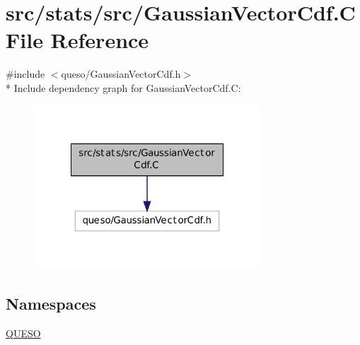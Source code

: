 \hypertarget{_gaussian_vector_cdf_8_c}{\section{src/stats/src/\-Gaussian\-Vector\-Cdf.C File Reference}
\label{_gaussian_vector_cdf_8_c}
}
{\ttfamily \#include $<$queso/\-Gaussian\-Vector\-Cdf.\-h$>$}\\*
Include dependency graph for Gaussian\-Vector\-Cdf.\-C\-:
\nopagebreak
\begin{figure}[H]
\begin{center}
\leavevmode
\includegraphics[width=240pt]{_gaussian_vector_cdf_8_c__incl}
\end{center}
\end{figure}
\subsection*{Namespaces}
\begin{DoxyCompactItemize}
\item 
\hyperlink{namespace_q_u_e_s_o}{Q\-U\-E\-S\-O}
\end{DoxyCompactItemize}
